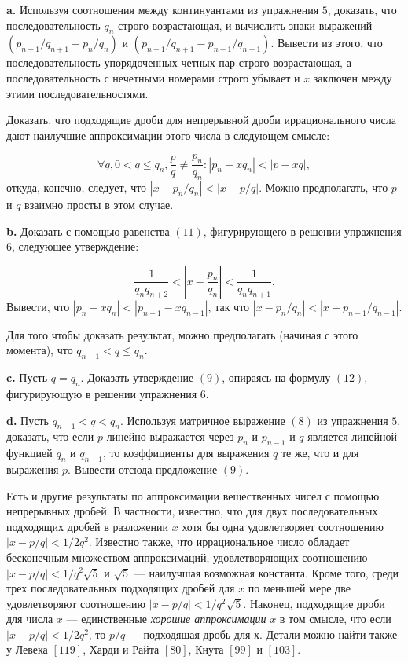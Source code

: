 \textbf{a.} Используя соотношения между континуантами из упражнения $5$,
доказать, что последовательность $q_n$ строго возрастающая, и 
вычислить знаки выражений $(p_{n+1}/q_{n+1} - p_n/q_n)$ и $(p_{n+1}/q_{n+1} -p_{n-1}/q_{n-1})$. Вывести из этого, что последовательность упорядоченных четных пар строго возрастающая, а последовательность с нечетными номерами
строго убывает и $x$ заключен между этими последовательностями.

Доказать, что подходящие дроби для непрерывной дроби 
иррационального числа дают наилучшие аппроксимации этого числа в 
следующем смысле:

\[
\forall q, 0<q \le q_n, \frac{p}{q} \ne \frac{p_n}{q_n}: |p_n-xq_n|<|p-xq|,
\]
откуда, конечно, следует, что $|x-p_n/q_n|<|x-p/q|$. Можно 
предполагать, что $p$ и $q$ взаимно просты в этом случае.

\textbf{b.} Доказать с помощью равенства $(11)$, фигурирующего в решении
упражнения $6$, следующее утверждение:

\[
\frac{1}{q_nq_{n+2}}<|x-\frac{p_n}{q_n}|<\frac{1}{q_nq_{n+1}}.
\]
Вывести, что $|p_n-xq_n| < |p_{n-1}-xq_{n-1}|$, так что $|x-p_n/q_n|<|x-p_{n-1}/q_{n-1}|$.

\pagebreak

Для того чтобы доказать результат, можно предполагать (начиная
с этого момента), что $q_{n-1} < q \le q_n$.

\textbf{c.} Пусть $q = q_n$. Доказать утверждение $(9)$, опираясь на 
формулу $(12)$, фигурирующую в решении упражнения $6$.

\textbf{d.} Пусть $q_{n-1}<q<q_n$. Используя матричное выражение $(8)$ из
упражнения $5$, доказать, что если $p$ линейно выражается через $p_n$ и
$p_{n-1}$ и $q$ является линейной функцией $q_n$ и $q_{n-1}$, то коэффициенты для выражения $q$ те же, что и для выражения $p$. Вывести отсюда 
предложение $(9)$.

\begin{mynotice}
Есть и другие результаты по аппроксимации вещественных чисел
с помощью непрерывных дробей. В частности, известно, что для двух
последовательных подходящих дробей в разложении $x$ хотя бы одна
удовлетворяет соотношению $|x-p/q| < 1/2q^2$. Известно также, что
иррациональное число обладает бесконечным множеством 
аппроксимаций, удовлетворяющих соотношению $|x-p/q| < 1/q^2 \sqrt{5}$ и $\sqrt{5}$ — наилучшая возможная константа. Кроме того, среди трех последовательных подходящих дробей для $x$ по меньшей мере две удовлетворяют 
соотношению $|x-p/q| < 1/q^2 \sqrt{5}$. Наконец, подходящие дроби для числа
$x$ — единственные \textit{хорошие аппроксимации} $x$ в том смысле, что если
$|x-p/q| < 1/2q^2$, то $p/q$ — подходящая дробь для $х$. Детали можно
найти также у Левека $[119]$, Харди и Райта $[80]$, Кнута $[99]$ и $[103]$.
\end{mynotice}

